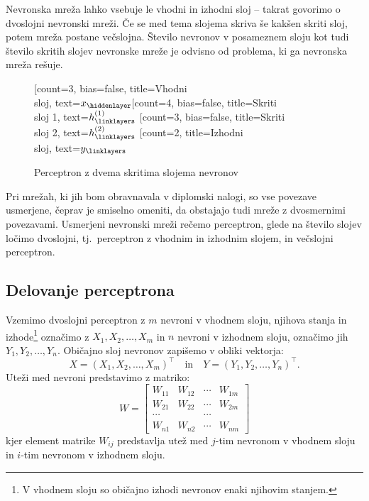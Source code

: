 \documentclass[mat1]{fmfdelo}
\begin{document}
 Nevronska mreža lahko vsebuje le vhodni in izhodni sloj -- takrat govorimo o dvoslojni nevronski mreži. Če se med tema slojema skriva še kakšen skriti sloj, potem mreža postane večslojna. Število nevronov v posameznem sloju kot tudi število skritih slojev nevronske mreže je odvisno od problema, ki ga nevronska mreža rešuje.
%
\begin{figure}
\centering
    \begin{neuralnetwork}[height=4]
        \newcommand{\x}[2]{$x_#2$}
        \newcommand{\y}[2]{$y_#2$}
        \newcommand{\hfirst}[2]{\small $h^{(1)}_#2$}
        \newcommand{\hsecond}[2]{\small $h^{(2)}_#2$}
        [count=3, bias=false, title=Vhodni\\sloj, text=\x]
        \hiddenlayer[count=4, bias=false, title=Skriti\\sloj 1, text=\hfirst] \linklayers
        \hiddenlayer[count=3, bias=false, title=Skriti\\sloj 2, text=\hsecond] \linklayers
        \outputlayer[count=2, title=Izhodni\\sloj, text=\y] \linklayers
    \end{neuralnetwork}
\label{mreza}
\caption{Perceptron z dvema skritima slojema nevronov}
\end{figure}
%
Pri mrežah, ki jih bom obravnavala v diplomski nalogi, so vse povezave usmerjene, čeprav je smiselno omeniti, da obstajajo tudi mreže z dvosmernimi povezavami. Usmerjeni nevronski mreži rečemo perceptron, glede na število slojev ločimo dvoslojni, tj.\ perceptron z vhodnim in izhodnim slojem, in večslojni perceptron.  
%
\subsection{Delovanje perceptrona}
Vzemimo dvoslojni perceptron z $m$ nevroni v vhodnem sloju, njihova stanja in izhode\footnote{V vhodnem sloju so običajno izhodi nevronov enaki njihovim stanjem.} označimo z $X_1, X_2, \ldots, X_m$ in $n$ nevroni v izhodnem sloju, označimo jih $Y_1, Y_2, \ldots, Y_{n}$. Običajno sloj nevronov zapišemo v obliki vektorja:
%
\begin{equation*}
X = (X_1, X_2, \dotso, X_m)^\intercal  \quad \text{in} \quad  Y = (Y_1, Y_2, \dotso, Y_n)^\intercal \text{.}
\end{equation*}
%
Uteži med nevroni predstavimo z matriko:
%
\begin{equation*}
W = \begin{bmatrix}
W_{11} &W_{12}  & \cdots & W_{1m}  \\
W_{21}  &W_{22}  &\cdots & W_{2m}  \\
\cdots &  &\cdots &  \\
W_{n1} & W_{n2} & \cdots & W_{nm} 
\end{bmatrix}  
\end{equation*}
%
kjer element matrike $W_{ij}$ predstavlja utež med $j$-tim nevronom v vhodnem sloju in $i$-tim nevronom v izhodnem sloju.
%
\end{document}
